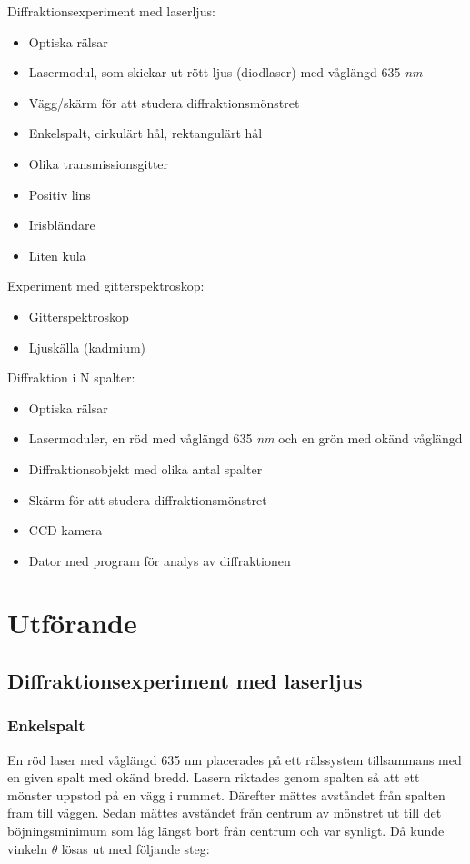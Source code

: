 \documentclass[conference]{IEEEtran}
\begin{document}
Diffraktionsexperiment med laserljus:
\begin{itemize}
    \item Optiska rälsar
    \item Lasermodul, som skickar ut rött ljus (diodlaser) med våglängd 635 \emph{nm}
    \item Vägg/skärm för att studera diffraktionsmönstret
    \item Enkelspalt, cirkulärt hål, rektangulärt hål
    \item Olika transmissionsgitter
    \item Positiv lins
    \item Irisbländare
    \item Liten kula
\end{itemize}

Experiment med gitterspektroskop:
\begin{itemize}
    \item Gitterspektroskop
    \item Ljuskälla (kadmium)
\end{itemize}

Diffraktion i N spalter: 
\begin{itemize}
    \item Optiska rälsar
    \item Lasermoduler, en röd med våglängd 635 \emph{nm} och en grön med okänd våglängd 
    \item Diffraktionsobjekt med olika antal spalter
    \item Skärm för att studera diffraktionsmönstret
    \item CCD kamera
    \item Dator med program för analys av diffraktionen
\end{itemize}


\section{Utförande}

\subsection{\textbf{Diffraktionsexperiment med laserljus}}
\subsubsection{Enkelspalt}
En röd laser med våglängd 635 nm placerades på ett rälssystem tillsammans med en given spalt med okänd bredd. Lasern riktades genom spalten så att ett mönster uppstod på en vägg i rummet. Därefter mättes avståndet från spalten fram till väggen. Sedan mättes avståndet från centrum av mönstret ut till det böjningsminimum som låg längst bort från centrum och var synligt. Då kunde vinkeln $\theta $ lösas ut med följande steg: 
\end{document}
